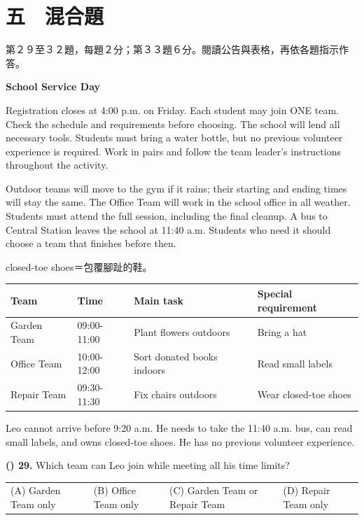 \documentclass[11pt,a4paper]{article}
\newenvironment{qblock}{\par\vspace{3pt}\noindent\begin{minipage}{\linewidth}}{\end{minipage}\par\vspace{4pt}}
\begin{document}
\newpage
\begingroup\small\section*{五　混合題}
{\small 第２９至３２題，每題２分；第３３題６分。閱讀公告與表格，再依各題指示作答。
\par\smallskip
}
\textbf{School Service Day}\par\smallskip
Registration closes at 4:00 p.m. on Friday. Each student may join ONE team. Check the schedule and requirements before choosing. The school will lend all necessary tools. Students must bring a water bottle, but no previous volunteer experience is required. Work in pairs and follow the team leader's instructions throughout the activity.
\par\smallskip
Outdoor teams will move to the gym if it rains; their starting and ending times will stay the same. The Office Team will work in the school office in all weather. Students must attend the full session, including the final cleanup. A bus to Central Station leaves the school at 11:40 a.m. Students who need it should choose a team that finishes before then.
\par\smallskip
{\small closed-toe shoes＝包覆腳趾的鞋。
\par\smallskip
}
\begin{center}\small\renewcommand{\arraystretch}{1.15}\begin{tabularx}{\linewidth}{|l|l|X|l|}\hline
Team & Time & Main task & Special requirement\\ \hline
Garden Team & 09:00-11:00 & Plant flowers outdoors & Bring a hat\\ \hline
Office Team & 10:00-12:00 & Sort donated books indoors & Read small labels\\ \hline
Repair Team & 09:30-11:30 & Fix chairs outdoors & Wear closed-toe shoes\\ \hline
\end{tabularx}\end{center}
Leo cannot arrive before 9:20 a.m. He needs to take the 11:40 a.m. bus, can read small labels, and owns closed-toe shoes. He has no previous volunteer experience.
\par\smallskip
\begin{qblock}
\textbf{(\hspace{0.6cm}) 29.} Which team can Leo join while meeting all his time limits?
\par
\begin{tabularx}{\linewidth}{@{}XXXX@{}}
(A) Garden Team only & (B) Office Team only & (C) Garden Team or Repair Team & (D) Repair Team only
\end{tabularx}
\end{qblock}
\end{document}
